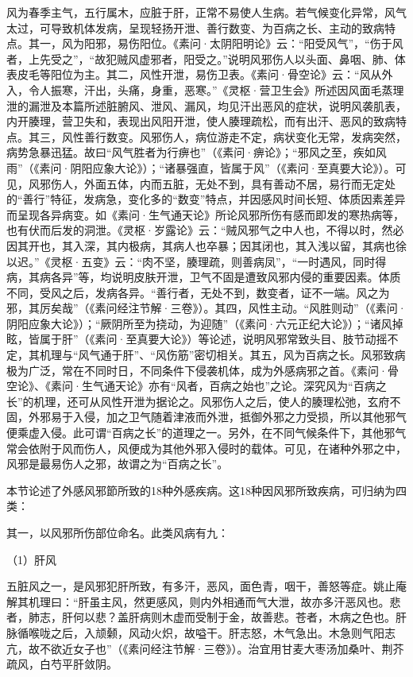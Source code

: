 \documentclass[draft,12pt]{ctexbook}
\begin{document}
风为春季主气，五行属木，应脏于肝，正常不易使人生病。若气候变化异常，风气太过，可导致机体发病，呈现轻扬开泄、善行数变、为百病之长、主动的致病特点。其一，风为阳邪，易伤阳位。《素问·太阴阳明论》云：“阳受风气”，“伤于风者，上先受之”，“故犯贼风虚邪者，阳受之。”说明风邪伤人以头面、鼻咽、肺、体表皮毛等阳位为主。其二，风性开泄，易伤卫表。《素问·骨空论》云：“风从外入，令人振寒，汗出，头痛，身重，恶寒。”《灵枢·营卫生会》所述因风面毛蒸理泄的漏泄及本篇所述脏腑风、泄风、漏风，均见汗出恶风的症状，说明风袭肌表，内开腠理，营卫失和，表现出风阳开泄，使人腠理疏松，而有出汗、恶风的致病特点。其三，风性善行数变。风邪伤人，病位游走不定，病状变化无常，发病突然，病势急暴迅猛。故曰“风气胜者为行痹也”（《素问·痹论》；“邪风之至，疾如风雨”（《素问·阴阳应象大论》）；“诸暴强直，皆属于风”（《素问·至真要大论》）。可见，风邪伤人，外面五体，内而五脏，无处不到，具有善动不居，易行而无定处的“善行”特征，发病急，变化多的“数变”特点，并因感风时间长短、体质因素差异而呈现各异病变。如《素问·生气通天论》所论风邪所伤有感而即发的寒热病等，也有伏而后发的洞泄。《灵枢·岁露论》云：“贼风邪气之中人也，不得以时，然必因其开也，其入深，其内极病，其病人也卒暴；因其闭也，其入浅以留，其病也徐以迟。”《灵枢·五变》云：“肉不坚，腠理疏，则善病凤”，“一时遇风，同时得病，其病各异”等，均说明皮肤开泄，卫气不固是遭致风邪内侵的重要因素。体质不同，受风之后，发病各异。“善行者，无处不到，数变者，证不一端。风之为邪，其厉矣哉”（《素问经注节解·三卷》）。其四，风性主动。“风胜则动”（《素问·阴阳应象大论》）；“厥阴所至为挠动，为迎随”（《素问·六元正纪大论》）；“诸风掉眩，皆属于肝”（《素问·至真要大论》）等论述，说明风邪常致头目、肢节动摇不定，其机理与“风气通于肝”、“风伤筋”密切相关。其五，风为百病之长。风邪致病极为广泛，常在不同时日，不同条件下侵袭机体，成为外感病邪之首。《素问·骨空论》、《素问·生气通天论》亦有“风者，百病之始也”之论。深究风为“百病之长”的机理，还可从风性开泄为据论之。风邪伤人之后，使人的腠理松弛，玄府不固，外邪易于入侵，加之卫气随着津液而外泄，抵御外邪之力受损，所以其他邪气便乘虚入侵。此可谓“百病之长”的道理之一。另外，在不同气候条件下，其他邪气常会依附于风而伤人，风便成为其他外邪入侵时的载体。可见，在诸种外邪之中，风邪是最易伤人之邪，故谓之为“百病之长”。


本节论述了外感风邪節所致的18种外感疾病。这18种因风邪所致疾病，可归纳为四类：

其一，以风邪所伤部位命名。此类风病有九：

（1）肝风

五脏风之一，是风邪犯肝所致，有多汗，恶风，面色青，咽干，善怒等症。姚止庵解其机理曰：“肝虽主风，然更感风，则内外相通而气大泄，故亦多汗恶风也。悲者，肺志，肝何以悲？盖肝病则木虚而受制于金，故善悲。苍者，木病之色也。肝脉循喉咙之后，入颃颡，风动火炽，故嗌干。肝志怒，木气急出。木急则气阳志亢，故不欲近女子也”（《素问经注节解·三卷》）。治宜用甘麦大枣汤加桑叶、荆芥疏风，白芍平肝敛阴。
\end{document}
